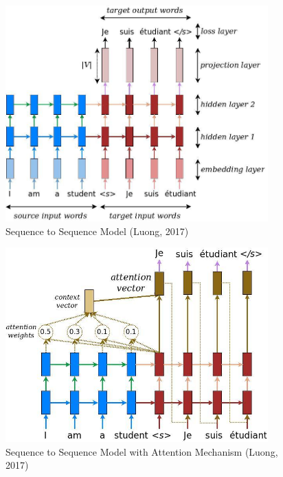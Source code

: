 \documentclass[10pt,a4paper]{article}
\begin{document}
  
\clearpage


\begin{figure}[H]
  \begin{center}
    \includegraphics[width=0.9\textwidth]{seq2seq.jpg}
    \caption{Sequence to Sequence Model (Luong, 2017)}
  \end{center}
\end{figure}


\begin{figure}[H]
  \begin{center}
    \includegraphics[width=0.9\textwidth] {attention_mechanism.jpg}
    \caption{Sequence to Sequence Model with Attention Mechanism (Luong, 2017)}
  \end{center}
\end{figure}
\end{document}
